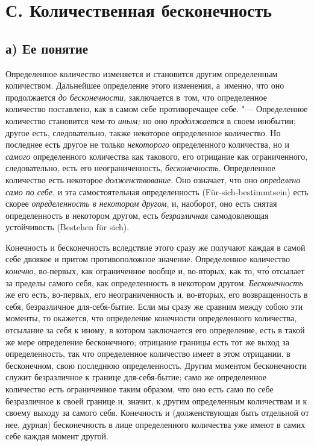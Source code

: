\section[С. Количественная бесконечность]{С. Количественная бесконечность}

\subsection[а) Ее понятие]{а) Ее понятие}

Определенное количество изменяется и становится другим определенным
количеством. Дальнейшее определение этого изменения, а~именно, что оно
продолжается {\em до бесконечности}, заключается в~том, что определенное
количество поставлено, как в самом себе противоречащее себе. "--- Определенное
количество становится чем-то {\em иным;} но оно {\em продолжается} в своем
инобытии; другое есть, следовательно, также некоторое определенное количество.
Но последнее есть другое не только {\em некоторого} определенного количества,
но и {\em самого} определенного количества как такового, его отрицание как
ограниченного, следовательно, есть его неограниченность, {\em бесконечность}.
Определенное количество есть некоторое {\em долженствование}. Оно означает, что
оно {\em определено само по себе}, и эта самостоятельная определенность
(Für-sich-bestimmtsein) есть скорее {\em определенность в некотором другом}, и,
наоборот, оно есть снятая определенность в некотором другом, есть
{\em безразличная} самодовлеющая устойчивость (Bestehen für sich).

Конечность и бесконечность вследствие этого сразу же получают каждая в самой
себе двоякое и притом противоположное значение. Определенное количество
{\em конечно}, во-первых, как ограниченное вообще и, во-вторых, как то, чт\'{о}
отсылает за пределы самого себя, как определенность в некотором другом.
{\em Бесконечность} же его есть, во-первых, его неограниченность и, во-вторых,
его возвращенность в себя, безразличное для-себя-бытие. Если мы сразу же
сравним между собою эти моменты, то окажется, что определение конечности
определенного количества, отсылание за себя к иному, в котором заключается его
определение, есть в такой же мере определение бесконечного; отрицание границы
есть тот же выход за определенность, так что определенное количество имеет
в этом отрицании, в бесконечном, свою последнюю определенность. Другим моментом
бесконечности служит безразличное к границе для-себя-бытие; само же
определенное количество есть ограниченное таким образом, что оно есть само по
себе безразличное к своей границе и, значит, к другим определенным количествам
и к своему выходу за самого себя. Конечность и (долженствующая быть отдельной
от нее, дурная) бесконечность в лице определенного количества уже имеют в самих
себе каждая момент другой.

